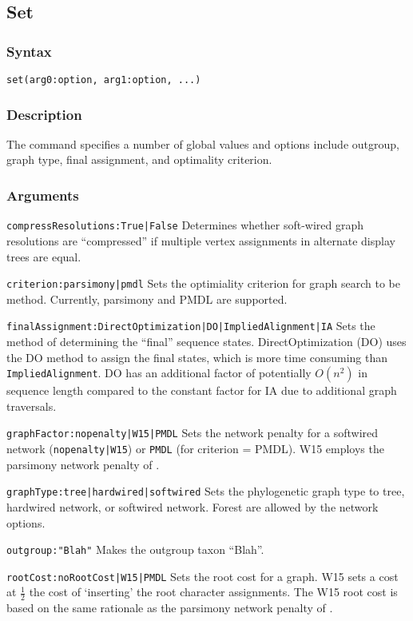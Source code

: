 \documentclass[11pt]{article}
\begin{document}
	\subsection{Set}
		\subsubsection{Syntax}
				\texttt{set(arg0:option, arg1:option, ...)}
		\subsubsection{Description}
		The command specifies a number of global values and options include outgroup, graph type, final assignment, and optimality criterion.
		\subsubsection{Arguments}
			\smallskip
			\noindent \texttt{compressResolutions:True|False} Determines whether soft-wired graph resolutions are ``compressed''
			if multiple vertex assignments in alternate display trees are equal.
			
			\smallskip
			\noindent \texttt{criterion:parsimony|pmdl} Sets the optimiality criterion for graph search to be method.  Currently, parsimony and PMDL \citep{WheelerandVaron2022} are supported.
			
			\smallskip
			\noindent \texttt{finalAssignment:DirectOptimization|DO|ImpliedAlignment|IA} Sets the method of determining the ``final''
			sequence states. DirectOptimization (DO) uses the DO method to assign the final states, which is more time consuming 
			than \texttt{ImpliedAlignment}. DO has an additional factor of potentially $O(n^2)$ in sequence length compared to the constant factor for IA due to additional graph traversals.
			
			\smallskip
			\noindent \texttt{graphFactor:nopenalty|W15|PMDL} Sets the network penalty  for a softwired network (\texttt{nopenalty|W15}) or \texttt{PMDL} (for criterion = PMDL).  W15 employs the
			parsimony network penalty of \cite{Wheeler2015}.
			
			\smallskip
			\noindent \texttt{graphType:tree|hardwired|softwired} Sets the phylogenetic graph type to tree, hardwired network, or softwired network.  Forest are allowed 
			by the network options.
			
			\smallskip
			\noindent \texttt{outgroup:"Blah"} Makes the outgroup taxon ``Blah''. 
			
			\smallskip
			\noindent \texttt{rootCost:noRootCost|W15|PMDL} Sets the root cost for a graph.  W15 sets a cost at $\frac{1}{2}$ the cost of `inserting' the root character assignments. 
			The W15 root cost is based on the same rationale as the parsimony network penalty of \cite{Wheeler2015}.
			
\end{document}
